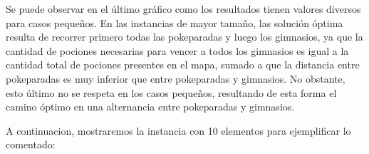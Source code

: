 \vspace*{0.3cm} \vspace*{0.3cm}
\begin{figure} [!ht]
 \centering
       \label{fig:anilloexacto}
    \label{fig:anillogoloso}
    \end{figure}
\vspace*{0.3cm} \vspace*{0.3cm}

Se puede observar en el \'ultimo gr\'afico como los resultados tienen valores diversos para casos pequeños. En las instancias de mayor tamaño, las solución óptima resulta de recorrer primero todas las pokeparadas y luego los gimnasios, ya que la cantidad de pociones necesarias para vencer a todos los gimnasios es igual a la cantidad total de pociones presentes en el mapa, sumado a que la distancia entre pokeparadas es muy inferior que entre pokeparadas y gimnasios.
No obstante, esto último no se respeta en los casos pequeños, resultando de esta forma el camino óptimo en una alternancia entre pokeparadas y gimnasios.

A continuacion, mostraremos la instancia con 10 elementos para ejemplificar lo comentado:

\newpage


